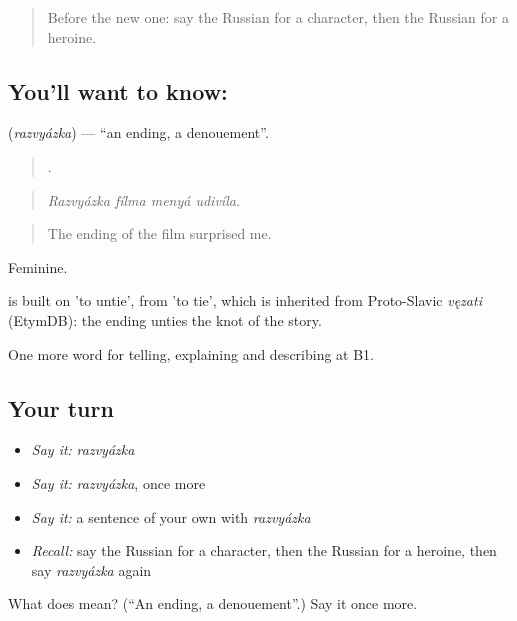 \begin{quote}
Before the new one: say the Russian for a character, then the Russian for a heroine.
\end{quote}

\subsection*{You'll want to know: }
\textbf{} (\emph{razvyázka}) — \textquotedblleft{}an ending, a denouement\textquotedblright{}.

\begin{quote}
   .
\end{quote}

\begin{quote}
\emph{Razvyázka fílma menyá udivíla.}
\end{quote}

\begin{quote}
The ending of the film surprised me.
\end{quote}

Feminine.

\begin{cousinweb}
\emph{} is built on \emph{} 'to untie', from \emph{} 'to tie', which is inherited from Proto-Slavic \emph{vęzati} (EtymDB): the ending unties the knot of the story.
\end{cousinweb}

\begin{grammarlens}[title={What you've built}]
One more word for telling, explaining and describing at B1.
\end{grammarlens}

\subsection*{Your turn}
\begin{itemize}
\raggedright
  \item \emph{Say it:} \emph{razvyázka}
  \item \emph{Say it:} \emph{razvyázka}, once more
  \item \emph{Say it:} a sentence of your own with \emph{razvyázka}
  \item \emph{Recall:} say the Russian for a character, then the Russian for a heroine, then say \emph{razvyázka} again
\end{itemize}

\begin{tcolorbox}[breakable,colback=teal!4,colframe=teal!35!black,title={Before you move on}]
What does  mean? (\textquotedblleft{}An ending, a denouement\textquotedblright{}.) Say it once more.
\end{tcolorbox}
